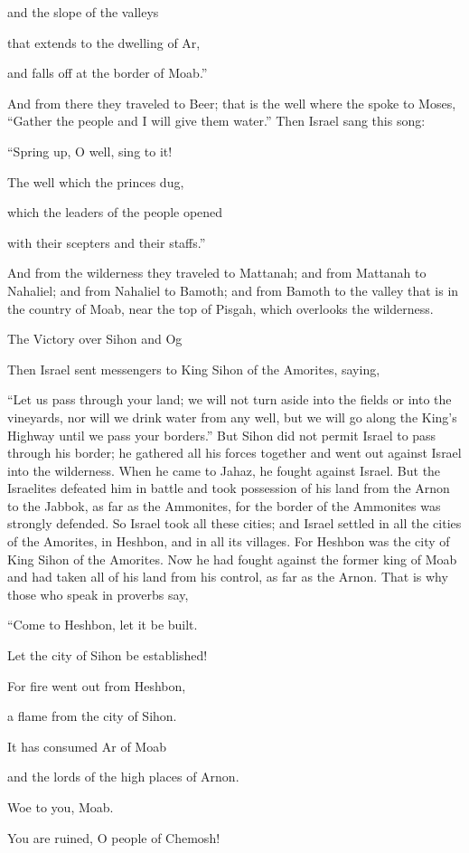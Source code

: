 {and the slope
of the valleys
\par }{\Q that extends
to the dwelling
of Ar,
\par }{\Q and falls off
at the border
of Moab.”
\par }{\PP {}And from there
they traveled to Beer;
that
is the well
where
the {}
spoke
to Moses,
“Gather
the people
and I will give
them water.”
Then
Israel
sang
this
song:
\par }{\Q “Spring up,
O well,
sing to it!
\par }{\Q {}The well
which the princes
dug,
\par }{\Q which the leaders
of the people
opened
\par }{\Q with their scepters
and their staffs.”
\par }{\PP And from the wilderness
they traveled to Mattanah;
and from Mattanah
to Nahaliel;
and from Nahaliel
to Bamoth;
and from Bamoth
to the valley
that
is in the country
of Moab,
near the top
of Pisgah,
which overlooks
the wilderness.
\par }{\SH The Victory over Sihon and Og
\par }{\PP {}Then
Israel
sent
messengers
to
King
Sihon
of the Amorites,
saying,
\par }{\PP {}“Let us pass
through your land;
we will not
turn aside
into the fields
or into the vineyards,
nor
will we drink
water
from any well,
but we will go along
the King’s
Highway
until
we pass
your borders.”
But Sihon
did not
permit
Israel
to pass through
his border;
he gathered
all
his forces
together and went out
against
Israel
into the wilderness.
When he came to
Jahaz,
he fought against
Israel.
But the Israelites
defeated
him in battle
and took possession
of his land
from the Arnon
to
the Jabbok,
as far
as the Ammonites,
for
the border
of the Ammonites
was strongly defended.
So
Israel
took
all
these
cities;
and Israel
settled
in all
the cities
of the Amorites,
in Heshbon,
and in all
its villages.
For
Heshbon
was the city
of King
Sihon
of the Amorites.
Now he
had fought
against the former
king
of Moab
and had taken
all
of his land
from his control,
as far
as the Arnon.
That is why
those who speak in proverbs
say,
\par }{\Q “Come
to Heshbon,
let it be built.
\par }{\Q Let the city
of Sihon
be established!
\par }{\Q {}For
fire
went out
from Heshbon,
\par }{\Q a flame
from the city
of Sihon.
\par }{\Q It has consumed
Ar
of Moab
\par }{\Q and the lords
of the high places
of Arnon.
\par }{\Q {}Woe
to you, Moab.
\par }{\Q You are ruined,
O people
of Chemosh!

}
